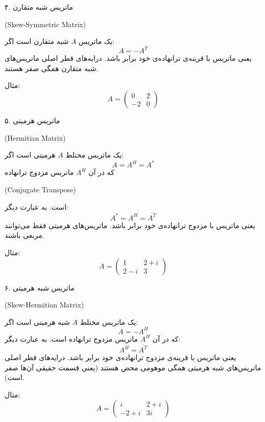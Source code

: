 	\begin{definition}
		 ۴. ماتریس شبه متقارن \begin{latin}
		 	(Skew-Symmetric Matrix)
		 \end{latin}
	یک ماتریس \( A \) شبه متقارن است اگر:
	\[
	A = -A^T
	\]
	یعنی ماتریس با قرینه‌ی ترانهاده‌ی خود برابر باشد. درایه‌های قطر اصلی ماتریس‌های شبه متقارن همگی صفر هستند.
	
	 مثال:
	\[
	A = \begin{pmatrix}
		0 & 2 \\
		-2 & 0
	\end{pmatrix}
	\]
	
	\end{definition}
	\begin{definition}
		
	 ۵. ماتریس هرمیتی 
\begin{latin}
(Hermitian Matrix)
\end{latin}
	یک ماتریس مختلط \( A \) هرمیتی است اگر:
	\[
	A = A^H=A^*
	\]
	که در آن \( A^H \) ماتریس مزدوج ترانهاده
	\begin{latin}
		 (Conjugate Transpose)
	\end{latin}
	 است. به عبارت دیگر:
	\[
A^*=A^H = \overline{A^T}
	\]
	یعنی ماتریس با مزدوج ترانهاده‌ی خود برابر باشد. ماتریس‌های هرمیتی فقط می‌توانند مربعی باشند.
	
	 مثال:
	\[
	A = \begin{pmatrix}
		1 & 2 + i \\
		2 - i & 3
	\end{pmatrix}
	\]

	\end{definition}
	\begin{definition}
		
	 ۶. ماتریس شبه هرمیتی \begin{latin}
	 	(Skew-Hermitian Matrix)
	 \end{latin}
	یک ماتریس مختلط \( A \) شبه هرمیتی است اگر:
	\[
	A = -A^H
	\]
	که در آن \( A^H \) ماتریس مزدوج ترانهاده است. به عبارت دیگر:
	\[
	A^H = \overline{A^T}
	\]
	یعنی ماتریس با قرینه‌ی مزدوج ترانهاده‌ی خود برابر باشد. درایه‌های قطر اصلی ماتریس‌های شبه هرمیتی همگی موهومی محض هستند (یعنی قسمت حقیقی آن‌ها صفر است).
	
	 مثال:
	\[
	A = \begin{pmatrix}
		i & 2 + i \\
		-2 + i & 3i
	\end{pmatrix}
	\]

	\end{definition}
